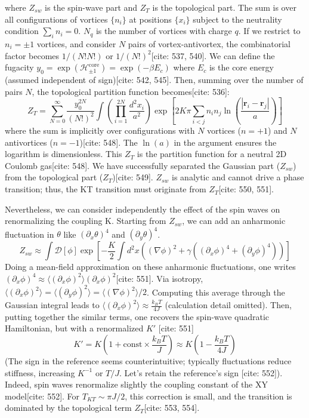 \documentclass[11pt]{article}
\begin{document}
where $Z_{sw}$ is the spin-wave part and $Z_T$ is the topological part. The sum is over all configurations of vortices $\{n_i\}$ at positions $\{x_i\}$ subject to the neutrality condition $\sum_i n_i = 0$. $N_q$ is the number of vortices with charge $q$. If we restrict to $n_i=\pm 1$ vortices, and consider $N$ pairs of vortex-antivortex, the combinatorial factor becomes $1/(N! N!)$ or $1/(N!)^2$[cite: 537, 540]. We can define the fugacity $y_0 = \exp(\mathcal{H}_{\pm 1}^{\text{core}}) = \exp(-\beta E_c)$ where $E_c$ is the core energy (assumed independent of sign)[cite: 542, 545]. Then, summing over the number of pairs $N$, the topological partition function becomes[cite: 536]:
\begin{equation}
Z_T = \sum_{N=0}^{\infty} \frac{y_0^{2N}}{(N!)^2} \int \left( \prod_{i=1}^{2N} \frac{d^2x_i}{a^2} \right) \exp\left[ 2 K \pi \sum_{i<j} n_i n_j \ln\left(\frac{|\mathbf{r}_i - \mathbf{r}_j|}{a}\right) \right] \label{eq:ZT_final}
\end{equation}
where the sum is implicitly over configurations with $N$ vortices ($n=+1$) and $N$ antivortices ($n=-1$)[cite: 548]. The $\ln(a)$ in the argument ensures the logarithm is dimensionless. This $Z_T$ is the partition function for a neutral 2D Coulomb gas[cite: 548]. We have successfully separated the Gaussian part ($Z_{sw}$) from the topological part ($Z_T$)[cite: 549]. $Z_{sw}$ is analytic and cannot drive a phase transition; thus, the KT transition must originate from $Z_T$[cite: 550, 551].

Nevertheless, we can consider independently the effect of the spin waves on renormalizing the coupling K. Starting from $Z_{sw}$, we can add an anharmonic fluctuation in $\theta$ like $(\partial_x \theta)^4$ and $(\partial_y \theta)^4$.
\begin{equation}
Z_{sw} \approx \int \mathcal{D}[\phi] \exp\left[ -\frac{K}{2} \int d^2x ((\nabla \phi)^2 + \gamma ((\partial_x \phi)^4 + (\partial_y \phi)^4)) \right] \label{eq:Zsw_anharm}
\end{equation}
Doing a mean-field approximation on these anharmonic fluctuations, one writes $(\partial_x \phi)^4 \approx \langle (\partial_x \phi)^2 \rangle (\partial_x \phi)^2$[cite: 551]. Via isotropy, $\langle (\partial_x \phi)^2 \rangle = \langle (\partial_y \phi)^2 \rangle = \langle (\nabla \phi)^2 \rangle / 2$. Computing this average through the Gaussian integral leads to $\langle (\partial_x \phi)^2 \rangle \approx \frac{k_B T}{4J}$ (calculation detail omitted). Then, putting together the similar terms, one recovers the spin-wave quadratic Hamiltonian, but with a renormalized $K'$ [cite: 551]
\begin{equation}
K' = K \left( 1 + \text{const} \times \frac{k_B T}{J} \right) \approx K \left( 1 - \frac{k_B T}{4J} \right) \label{eq:K_renorm_sw}
\end{equation}
(The sign in the reference seems counterintuitive; typically fluctuations reduce stiffness, increasing $K^{-1}$ or $T/J$. Let's retain the reference's sign [cite: 552]). Indeed, spin waves renormalize slightly the coupling constant of the XY model[cite: 552]. For $T_{KT} \sim \pi J / 2$, this correction is small, and the transition is dominated by the topological term $Z_T$[cite: 553, 554].
\end{document}
